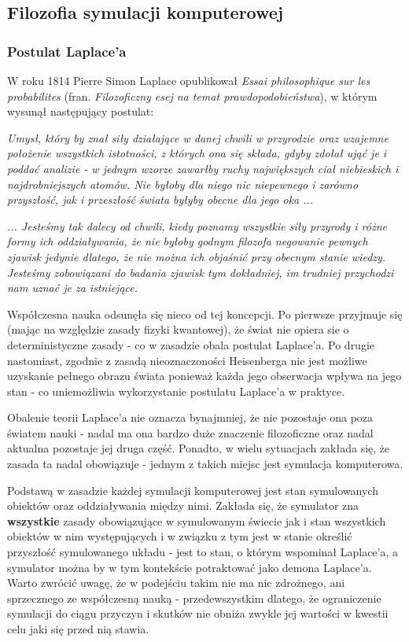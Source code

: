 \subsection{Filozofia symulacji komputerowej}

\subsubsection{Postulat Laplace'a}
\par{
W roku 1814 Pierre Simon Laplace opublikował \textit{Essai philosophique sur les probabilites} (fran. \textit{Filozoficzny esej na temat prawdopodobieństwa}), w którym wysunął następujący postulat:
}
\par{
\textit{Umysł, który by znał siły działające w danej chwili w przyrodzie oraz wzajemne położenie wszystkich istotności, z których ona się składa, gdyby zdołał ująć je i poddać analizie - w jednym wzorze zawarłby ruchy największych ciał niebieskich i najdrobniejszych atomów. Nie byłoby dla niego nic niepewnego i zarówno przyszłość, jak i przeszłość świata byłyby obecne dla jego oka ...
}}
\par{
\textit{... Jesteśmy tak dalecy od chwili, kiedy poznamy wszystkie siły przyrody i różne formy ich oddziaływania, że nie byłoby godnym filozofa negowanie pewnych zjawisk jedynie dlatego, że nie można ich objaśnić przy obecnym stanie wiedzy. Jesteśmy zobowiązani do badania zjawisk tym dokładniej, im trudniej przychodzi nam uznać je za istniejące.}
}

\par{
Współczesna nauka odsunęła się nieco od tej koncepcji. Po pierwsze przyjmuje się (mając na względzie zasady fizyki kwantowej), że świat nie opiera sie o deterministyczne zasady - co w zasadzie obala postulat Laplace'a. Po drugie nastomiast, zgodnie z zasadą nieoznaczoności Heisenberga nie jest możliwe uzyskanie pełnego obrazu świata ponieważ każda jego obserwacja wpływa na jego stan - co uniemożliwia wykorzystanie postulatu Laplace'a w praktyce.
}
\par{
Obalenie teorii Laplace'a nie oznacza bynajmniej, że nie pozostaje ona poza światem nauki - nadal ma ona bardzo duże znaczenie filozoficzne oraz nadal aktualna pozostaje jej druga część. Ponadto, w wielu sytuacjach zakłada się, że zasada ta nadal obowiązuje - jednym z takich miejsc jest symulacja komputerowa.
}
\par{
Podstawą w zasadzie każdej symulacji komputerowej jest stan symulowanych obiektów oraz oddziaływania między nimi. Zakłada się, że symulator zna \textbf{wszystkie} zasady obowiązujące w symulowanym świecie jak i stan wszystkich obiektów w nim występujących i w związku z tym jest w stanie określić przyszłość symulowanego układu - jest to stan, o którym wspominał Laplace'a, a symulator można by w tym kontekście potraktować jako demona Laplace'a. Warto zwrócić uwagę, że w podejściu takim nie ma nic zdrożnego, ani sprzecznego ze współczesną nauką - przedewszystkim dlatego, że ograniczenie symulacji do ciągu przyczyn i skutków nie obniża zwykle jej wartości w kwestii celu jaki się przed nią stawia.
}

